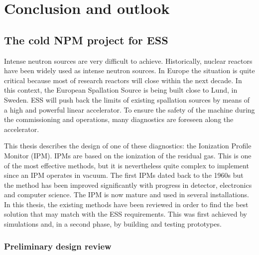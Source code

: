 \chapter{Conclusion and outlook}
\cleardoublepage

\minitoc
\section*{The cold NPM project for ESS}
Intense neutron sources are very difficult to achieve. Historically, nuclear reactors have been widely used as intense neutron sources. In Europe the situation is quite critical because most of research reactors will close within the next decade. In this context, the European Spallation Source is being built close to Lund, in Sweden. ESS will push back the limits of existing spallation sources by means of a high and powerful linear accelerator. To ensure the safety of the machine during the commissioning and operations, many diagnostics are foreseen along the accelerator.

This thesis describes the design of one of these diagnostics: the Ionization Profile Monitor (IPM). IPMs are based on the ionization of the residual gas. This is one of the most effective methods, but it is nevertheless quite complex to implement since an IPM operates in vacuum. The first IPMs dated back to the 1960s but the method has been improved significantly with progress in detector, electronics and computer science. The IPM is now mature and used in several installations. In this thesis, the existing methods have been reviewed in order to find the best solution that may match with the ESS requirements. This was first achieved by simulations and, in a second phase, by building and testing prototypes.

\subsection*{Preliminary design review}

